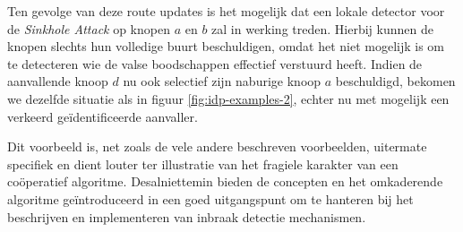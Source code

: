 Ten gevolge van deze route updates is het mogelijk dat een lokale detector voor
de \emph{Sinkhole Attack} op knopen $a$ en $b$ zal in werking treden. Hierbij
kunnen de knopen slechts hun volledige buurt beschuldigen, omdat het niet
mogelijk is om te detecteren wie de valse boodschappen effectief verstuurd
heeft. Indien de aanvallende knoop $d$ nu ook selectief zijn naburige knoop $a$
beschuldigd, bekomen we dezelfde situatie als in figuur
\ref{fig:idp-examples-2}, echter nu met mogelijk een verkeerd
ge\"identificeerde aanvaller.

Dit voorbeeld is, net zoals de vele andere beschreven voorbeelden, uitermate
specifiek en dient louter ter illustratie van het fragiele karakter van een
co\"operatief algoritme. Desalniettemin bieden de concepten en het omkaderende
algoritme ge\"introduceerd in \cite{krontiris2009cooperative} een goed
uitgangspunt om te hanteren bij het beschrijven en implementeren van inbraak
detectie mechanismen.

\TODO

\cite{castelluccia2009difficulty,krauss2007detecting,seshadri2008sake,maerien2012famos,aschenbruck2012security,afzal2012difisec,yue2012novel,kuang2010snds,blilat2012wireless,ramesh2012wireless,valero2012di,perrig2004security,zhang2000intrusion,djenouri2005survey,yu2008framework,rassam2011novel,da2005decentralized,kachirski2003effective,li2008group,mishra2004intrusion,krontiris2008lidea,ioannis2007towards,soliman2012comparative,wang2011integrated,zhijie2012intrusion}
